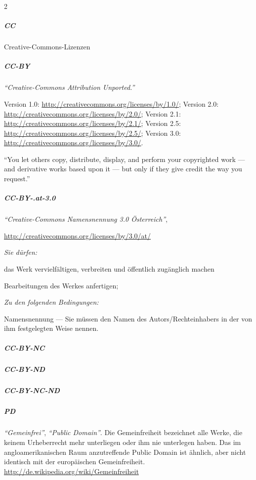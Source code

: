 \documentclass[
ngerman,
paper=a4,
asymmetric,
fontsize=9pt,
headings=small,
draft=false,
parskip=false,
footnotes=multiple,
]{scrbook}
\begin{document}
\begin{multicols}{2}
{\scriptsize


\subparagraph{CC} Creative-Commons-Lizenzen

\subparagraph{CC-BY} \emph{"`Creative-Commons Attribution Unported."'}
  \begin{inparadesc}
    \item[Lizenztext (Link):]
    Version 1.0: \url{http://creativecommons.org/licenses/by/1.0/};
    Version 2.0: \url{http://creativecommons.org/licenses/by/2.0/};
    Version 2.1: \url{http://creativecommons.org/licenses/by/2.1/};
    Version 2.5: \url{http://creativecommons.org/licenses/by/2.5/};
    Version 3.0: \url{http://creativecommons.org/licenses/by/3.0/}.
    \item[Kurzfassung (ohne Gewähr):] "`You let others copy, distribute,
    display, and perform your copyrighted work — and derivative works based
    upon it — but only if they give credit the way you request."'
  \end{inparadesc}  
  
\subparagraph{CC-BY-.at-3.0} \emph{"`Creative-Commons Namensnennung 3.0
  Österreich"'},
  \begin{inparadesc}
    \item[Lizenztext (Link):]
    \url{http://creativecommons.org/licenses/by/3.0/at/}
    \item[Kurzfassung (ohne Gewähr):] \emph{Sie dürfen:}
    \begin{inparaitem}
      \item das Werk vervielfältigen, verbreiten und öffentlich zugänglich machen
      \item Bearbeitungen des Werkes anfertigen;
    \end{inparaitem}
    \emph{Zu den folgenden Bedingungen:}
    \begin{inparaitem}
      \item  Namensnennung — Sie müssen den Namen des Autors/Rechteinhabers in der
      von ihm festgelegten Weise nennen.
    \end{inparaitem}
  \end{inparadesc}

\subparagraph{CC-BY-NC}

\subparagraph{CC-BY-ND}

\subparagraph{CC-BY-NC-ND}
  
\subparagraph{PD} \emph{"`Gemeinfrei"'}, \emph{"`Public Domain"'}. Die
Gemeinfreiheit bezeichnet alle Werke, die keinem Urheberrecht mehr unterliegen oder ihm nie
  unterlegen haben. Das im angloamerikanischen Raum anzutreffende Public Domain
  ist ähnlich, aber nicht identisch mit der europäischen Gemeinfreiheit.
  \url{http://de.wikipedia.org/wiki/Gemeinfreiheit}


  }
\end{multicols}
\end{document}
